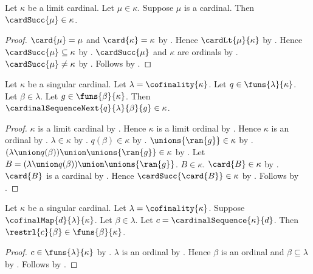 \begin{proposition}\label{successor_cardinal_below_limit_cardinal}
    Let $\kappa$ be a limit cardinal.
    Let $\mu\in\kappa$.
    Suppose $\mu$ is a cardinal.
    Then $\cardSucc{\mu}\in\kappa$.
\end{proposition}
\begin{proof}
    $\card{\mu}=\mu$ and $\card{\kappa}=\kappa$
        by .
    Hence $\cardLt{\mu}{\kappa}$
        by .
    Hence $\cardSucc{\mu}\subseteq\kappa$
        by .
    $\cardSucc{\mu}$ and $\kappa$ are ordinals
        by .
    $\cardSucc{\mu}\neq\kappa$ by .
    Follows by .
\end{proof}

\begin{proposition}\label{cardinal_sequence_next_below}
    Let $\kappa$ be a singular cardinal.
    Let $\lambda=\cofinality{\kappa}$.
    Let $q\in\funs{\lambda}{\kappa}$.
    Let $\beta\in\lambda$.
    Let $g\in\funs{\beta}{\kappa}$.
    Then $\cardinalSequenceNext{q}{\lambda}{\beta}{g}\in\kappa$.
\end{proposition}
\begin{proof}
    $\kappa$ is a limit cardinal
        by .
    Hence $\kappa$ is a limit ordinal
        by .
    Hence $\kappa$ is an ordinal by .
    $\lambda\in\kappa$
        by .
    $q(\beta)\in\kappa$ by .
    $\unions{\ran{g}}\in\kappa$
        by .
    $(\lambda\union q(\beta))\union\unions{\ran{g}}\in\kappa$
        by .
    Let $B=(\lambda\union q(\beta))\union\unions{\ran{g}}$.
    $B\in\kappa$.
    $\card{B}\in\kappa$ by .
    $\card{B}$ is a cardinal by .
    Hence $\cardSucc{\card{B}}\in\kappa$
        by .
    Follows by .
\end{proof}

\begin{proposition}\label{cardinal_sequence_restriction_type}
    Let $\kappa$ be a singular cardinal.
    Let $\lambda=\cofinality{\kappa}$.
    Suppose $\cofinalMap{d}{\lambda}{\kappa}$.
    Let $\beta\in\lambda$.
    Let $c=\cardinalSequence{\kappa}{d}$.
    Then $\restrl{c}{\beta}\in\funs{\beta}{\kappa}$.
\end{proposition}
\begin{proof}
    $c\in\funs{\lambda}{\kappa}$ by .
    $\lambda$ is an ordinal
        by .
    Hence $\beta$ is an ordinal and $\beta\subseteq\lambda$
        by .
    Follows by .
\end{proof}

